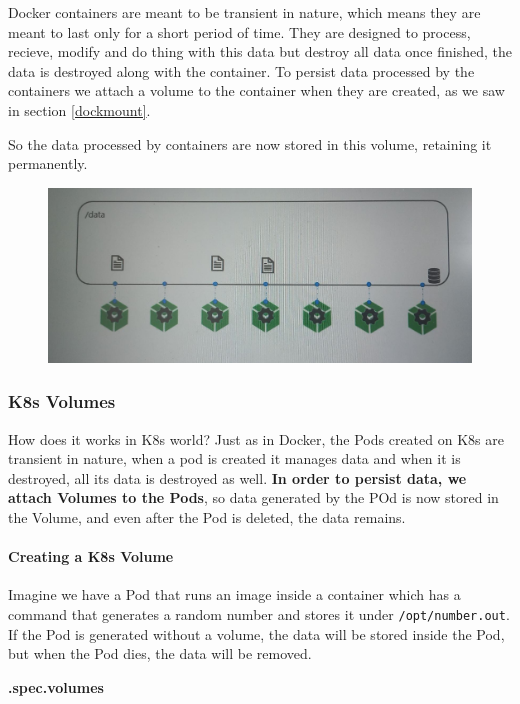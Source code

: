 \documentclass{article}
\begin{document}
Docker containers are meant to be transient in nature, which means they are meant to last only for a short period of time. They are designed to process, recieve, modify and do thing with this data but destroy all data once finished, the data is destroyed along with the container. To persist data processed by the containers we attach a volume to the container when they are created, as we saw in section \ref{dockmount}. 

So the data processed by containers are now stored in this volume, retaining it permanently.

\begin{figure}[H]
    \includegraphics[width=\textwidth]{pictures/st4.png}
\end{figure}

\subsubsection{K8s Volumes}

How does it works in K8s world? Just as in Docker, the Pods created on K8s are transient in nature, when a pod is created it manages data and when it is destroyed, all its data is destroyed as well. \textbf{In order to persist data, we attach Volumes to the Pods}, so data generated by the POd is now stored in the Volume, and even after the Pod is deleted, the data remains.

\paragraph{Creating a K8s Volume}

Imagine we have a Pod that runs an image inside a container which has a command that generates a random number and stores it under \verb|/opt/number.out|. If the Pod is generated without a volume, the data will be stored inside the Pod, but when the Pod dies, the data will be removed.

\textbf{.spec.volumes}
\end{document}
